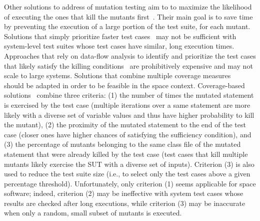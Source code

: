 Other solutions to address  of mutation testing  aim to  to maximize the likelihood of executing the ones that kill the mutants first~\cite{just2012using,papadakis2011automatically,zhang2013faster}. Their main goal is to save time by preventing the execution of a large portion of the test suite, for each mutant.
Solutions that simply prioritize faster test cases~\cite{just2012using}
 may not be sufficient with system-level test suites whose test cases have similar, long execution times.
Approaches that rely on data-flow analysis to identify and prioritize the test cases that likely satisfy the killing conditions~\cite{papadakis2011automatically} are prohibitively expensive and may not scale to large systems.
Solutions that combine multiple coverage measures~\cite{zhang2013faster} should be adapted in order 
to be feasible in the space context.
Coverage-based solutions~\cite{zhang2013faster} combine three criteria: (1) the number of times the mutated statement is exercised by the test case (multiple iterations over a same statement are more likely with a diverse set of variable values and thus have higher probability to kill the mutant), (2) the proximity of the mutated statement to the end of the test case (closer ones have higher chances of satisfying the sufficiency condition), and (3) the percentage of mutants belonging to the same class file of the mutated statement that were already killed by the test case (test cases that kill multiple mutants likely exercise the SUT with a diverse set of inputs). 
Criterion (3) is also used to reduce the test suite size (i.e., to select only the test cases above a given percentage threshold). 
Unfortunately, only criterion (1) seems applicable for space software; indeed, criterion (2) may be ineffective with system test cases whose results are checked after long executions, while criterion (3) may be inaccurate when only a random, small subset of mutants is executed. 






%
%
%




